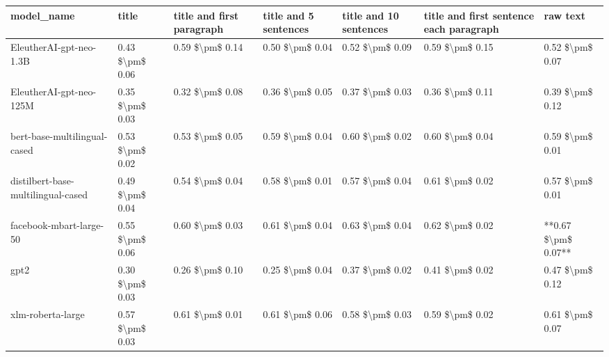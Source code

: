 \begin{tabular}{lllllll}
\toprule
                        model\_name &           title & title and first paragraph & title and 5 sentences & title and 10 sentences & title and first sentence each paragraph &            raw text \\
\midrule
           EleutherAI-gpt-neo-1.3B & 0.43 \$\textbackslash pm\$ 0.06 &           0.59 \$\textbackslash pm\$ 0.14 &       0.50 \$\textbackslash pm\$ 0.04 &        0.52 \$\textbackslash pm\$ 0.09 &                         0.59 \$\textbackslash pm\$ 0.15 &     0.52 \$\textbackslash pm\$ 0.07 \\
           EleutherAI-gpt-neo-125M & 0.35 \$\textbackslash pm\$ 0.03 &           0.32 \$\textbackslash pm\$ 0.08 &       0.36 \$\textbackslash pm\$ 0.05 &        0.37 \$\textbackslash pm\$ 0.03 &                         0.36 \$\textbackslash pm\$ 0.11 &     0.39 \$\textbackslash pm\$ 0.12 \\
      bert-base-multilingual-cased & 0.53 \$\textbackslash pm\$ 0.02 &           0.53 \$\textbackslash pm\$ 0.05 &       0.59 \$\textbackslash pm\$ 0.04 &        0.60 \$\textbackslash pm\$ 0.02 &                         0.60 \$\textbackslash pm\$ 0.04 &     0.59 \$\textbackslash pm\$ 0.01 \\
distilbert-base-multilingual-cased & 0.49 \$\textbackslash pm\$ 0.04 &           0.54 \$\textbackslash pm\$ 0.04 &       0.58 \$\textbackslash pm\$ 0.01 &        0.57 \$\textbackslash pm\$ 0.04 &                         0.61 \$\textbackslash pm\$ 0.02 &     0.57 \$\textbackslash pm\$ 0.01 \\
           facebook-mbart-large-50 & 0.55 \$\textbackslash pm\$ 0.06 &           0.60 \$\textbackslash pm\$ 0.03 &       0.61 \$\textbackslash pm\$ 0.04 &        0.63 \$\textbackslash pm\$ 0.04 &                         0.62 \$\textbackslash pm\$ 0.02 & **0.67 \$\textbackslash pm\$ 0.07** \\
                              gpt2 & 0.30 \$\textbackslash pm\$ 0.03 &           0.26 \$\textbackslash pm\$ 0.10 &       0.25 \$\textbackslash pm\$ 0.04 &        0.37 \$\textbackslash pm\$ 0.02 &                         0.41 \$\textbackslash pm\$ 0.02 &     0.47 \$\textbackslash pm\$ 0.12 \\
                 xlm-roberta-large & 0.57 \$\textbackslash pm\$ 0.03 &           0.61 \$\textbackslash pm\$ 0.01 &       0.61 \$\textbackslash pm\$ 0.06 &        0.58 \$\textbackslash pm\$ 0.03 &                         0.59 \$\textbackslash pm\$ 0.02 &     0.61 \$\textbackslash pm\$ 0.07 \\
\bottomrule
\end{tabular}
